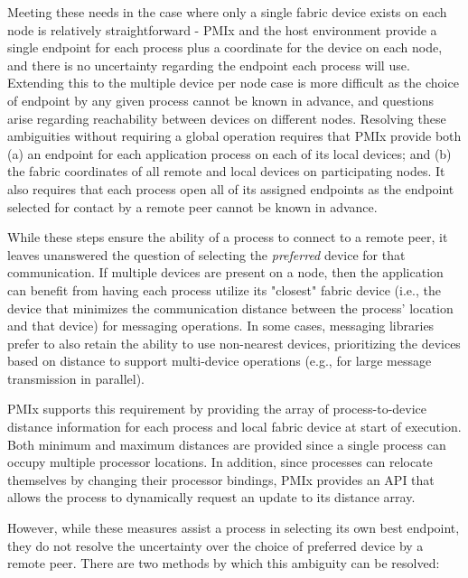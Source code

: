 Meeting these needs in the case where only a single fabric device exists on each node is relatively straightforward - \ac{PMIx} and the host environment provide a single endpoint for each process plus a coordinate for the device on each node, and there is no uncertainty regarding the endpoint each process will use. Extending this to the multiple device per node case is more difficult as the choice of endpoint by any given process cannot be known in advance, and questions arise regarding reachability between devices on different nodes. Resolving these ambiguities without requiring a global operation requires that \ac{PMIx} provide both (a) an endpoint for each application process on each of its local devices; and (b) the fabric coordinates of all remote and local devices on participating nodes. It also requires that each process open all of its assigned endpoints as the endpoint selected for contact by a remote peer cannot be known in advance.

While these steps ensure the ability of a process to connect to a remote peer, it leaves unanswered the question of selecting the \emph{preferred} device for that communication. If multiple devices are present on a node, then the application can benefit from having each process utilize its "closest" fabric device (i.e., the device that minimizes the communication distance between the process' location and that device) for messaging operations. In some cases, messaging libraries prefer to also retain the ability to use non-nearest devices, prioritizing the devices based on distance to support multi-device operations (e.g., for large message transmission in parallel).

\ac{PMIx} supports this requirement by providing the array of process-to-device distance information for each process and local fabric device at start of execution. Both minimum and maximum distances are provided since a single process can occupy multiple processor locations. In addition, since processes can relocate themselves by changing their processor bindings, \ac{PMIx} provides an \ac{API} that allows the process to dynamically request an update to its distance array.

However, while these measures assist a process in selecting its own best endpoint, they do not resolve the uncertainty over the choice of preferred device by a remote peer. There are two methods by which this ambiguity can be resolved:

